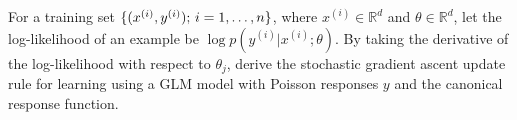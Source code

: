 \item {} For a training set
$\{(x^{(i)}, y^{(i)});\, i=1,\ldots,{n}\}$, where $x^{(i)} \in \mathbb{R}^d$ and
$\theta \in \mathbb{R}^d$, let the log-likelihood of an example
be $\log p(y^{(i)} | x^{(i)}; \theta)$. By taking the derivative of the
log-likelihood with respect to $\theta_j$, derive the stochastic gradient
ascent update rule for learning using a GLM model with Poisson responses $y$
and the canonical response function.
